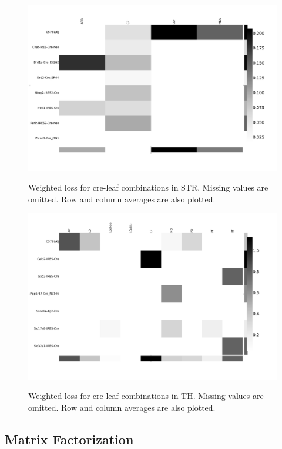 \begin{figure}[H]
    \centering
    \includegraphics[width = 7in]{figs/lossdetails_477.png} 
    \label{fig:distances}
    \caption{Weighted loss for cre-leaf combinations in STR. Missing values are omitted.   Row and column averages are also plotted.}
\end{figure}

\begin{figure}[H]
    \centering
    \includegraphics[width = 7in]{figs/lossdetails_549.png} 
    \label{fig:distances}
    \caption{Weighted loss for cre-leaf combinations in TH. Missing values are omitted.   Row and column averages are also plotted.}
\end{figure}

\newpage

\subsection{Matrix Factorization}
\label{supp_sec:matrix_factor_results}

